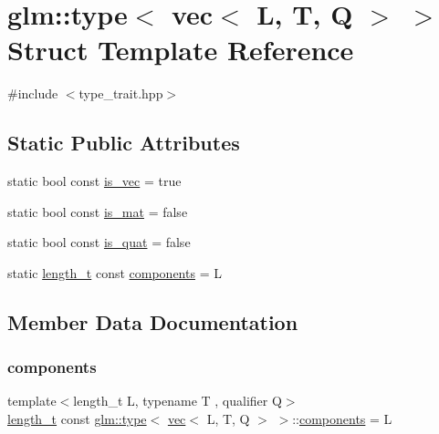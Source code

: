 \hypertarget{structglm_1_1type_3_01vec_3_01_l_00_01_t_00_01_q_01_4_01_4}{}\section{glm\+:\+:type$<$ vec$<$ L, T, Q $>$ $>$ Struct Template Reference}
\label{structglm_1_1type_3_01vec_3_01_l_00_01_t_00_01_q_01_4_01_4}


{\ttfamily \#include $<$type\+\_\+trait.\+hpp$>$}

\subsection*{Static Public Attributes}
\begin{DoxyCompactItemize}
\item 
static bool const \hyperlink{structglm_1_1type_3_01vec_3_01_l_00_01_t_00_01_q_01_4_01_4_a43041d99d1a7516c028d1f8dd8ac7daf}{is\+\_\+vec} = true
\item 
static bool const \hyperlink{structglm_1_1type_3_01vec_3_01_l_00_01_t_00_01_q_01_4_01_4_a22bba98c88e09815e508383d406fcbab}{is\+\_\+mat} = false
\item 
static bool const \hyperlink{structglm_1_1type_3_01vec_3_01_l_00_01_t_00_01_q_01_4_01_4_a3ffd0878bcefe94549e17188bfb500d5}{is\+\_\+quat} = false
\item 
static \hyperlink{namespaceglm_a090a0de2260835bee80e71a702492ed9}{length\+\_\+t} const \hyperlink{structglm_1_1type_3_01vec_3_01_l_00_01_t_00_01_q_01_4_01_4_acfe23241fdf64745cc6310996c36aee6}{components} = L
\end{DoxyCompactItemize}


\subsection{Member Data Documentation}
\mbox{\label{structglm_1_1type_3_01vec_3_01_l_00_01_t_00_01_q_01_4_01_4_acfe23241fdf64745cc6310996c36aee6}} 
\subsubsection{\texorpdfstring{components}{components}}
{\footnotesize\ttfamily template$<$length\+\_\+t L, typename T , qualifier Q$>$ \\
\hyperlink{namespaceglm_a090a0de2260835bee80e71a702492ed9}{length\+\_\+t} const \hyperlink{structglm_1_1type}{glm\+::type}$<$ \hyperlink{structglm_1_1vec}{vec}$<$ L, T, Q $>$ $>$\+::\hyperlink{_s_d_l__opengl__glext_8h_a3824c86dfa50d23068c74eafb87375c2}{components} = L\hspace{0.3cm}{\ttfamily [static]}}

